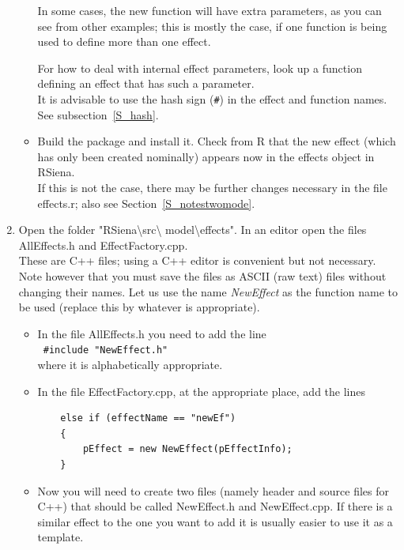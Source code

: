 \documentclass[a4paper,fleqn,11pt]{article}
\newcommand{\+}{\, + \,}
\newcommand{\sfn}[1]{\textsf{#1}}
\begin{document}
\begin{enumerate}
\begin{itemize}
              In some cases, the new function will have extra parameters,
              as you can see from other examples;
              this is mostly the case, if one function is being used to define
              more than one effect.

              For how to deal with internal effect parameters, look up
              a function defining an effect that has such
              a parameter.\\
              It is advisable to use the hash sign (\texttt{\#}) in the
              effect and function names. See subsection~\ref{S_hash}.


		\item Build the package and install it.  Check from R that
              the new effect (which has only been created nominally)
              appears now in the effects object in RSiena.\\
              If this is not the case, there may be further changes necessary
              in the file \sfn{effects.r}; also see
              Section~\ref{S_notestwomode}.
		\end{itemize}
\item Open the folder
      \textsf{"RSiena\textbackslash src\textbackslash
         model\textbackslash effects"}.
         In an editor open the files \textsf{AllEffects.h}
         and  \textsf{EffectFactory.cpp}.\\
         These are C++ files; using a C++ editor is convenient
         but not necessary. Note however that you must save the files
         as ASCII (raw text) files without changing their names.
        Let us use the name \textit{NewEffect} as the function name
        to be used (replace this by whatever is appropriate).
		\begin{itemize}
			\item In the file AllEffects.h you need to add the line\\
                \texttt{ \#include "NewEffect.h" }\\
                 where it is alphabetically appropriate.
            \item In the file \textsf{EffectFactory.cpp}, at the appropriate place,
                  add the lines
                \begin{verbatim}
    else if (effectName == "newEf")
	{
		pEffect = new NewEffect(pEffectInfo);
	}
                \end{verbatim}
			\item Now you will need to create two files (namely header
                  and source files for
                   C++) that should be called \textsf{NewEffect.h} and
                   \textsf{NewEffect.cpp}.
                   If there is a similar effect to the one you want to add
                   it is usually easier to use it as a template.


\end{itemize}
\end{enumerate}
\end{document}
